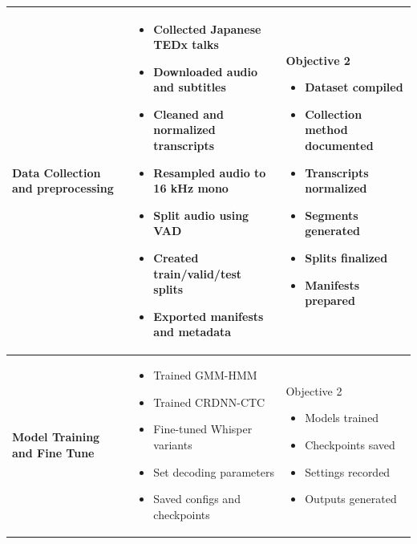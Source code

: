 \begin{table}[H]
{\begin{tabular}{ p{2.8cm}  p{5.3cm}  p{5.3cm}  }
\textbf{Data Collection and preprocessing} &
\begin{itemize}[leftmargin=*, nosep]
  \item Collected Japanese TEDx talks
  \item Downloaded audio and subtitles
  \item Cleaned and normalized transcripts
  \item Resampled audio to 16 kHz mono
  \item Split audio using VAD
  \item Created train/valid/test splits
  \item Exported manifests and metadata
\end{itemize}
&
Objective 2
\begin{itemize}[leftmargin=*, nosep]
  \item Dataset compiled
  \item Collection method documented
  \item Transcripts normalized
  \item Segments generated
  \item Splits finalized
  \item Manifests prepared
\end{itemize}
\\ \hline

\textbf{Model Training and Fine Tune} &
\begin{itemize}[leftmargin=*, nosep]
  \item Trained GMM-HMM
  \item Trained CRDNN-CTC 
  \item Fine-tuned Whisper variants
  \item Set decoding parameters
  \item Saved configs and checkpoints
\end{itemize}
&
Objective 2
\begin{itemize}[leftmargin=*, nosep]
  \item Models trained
  \item Checkpoints saved
  \item Settings recorded
  \item Outputs generated
\end{itemize}
\\ \hline


\end{tabular}}
\end{table}
